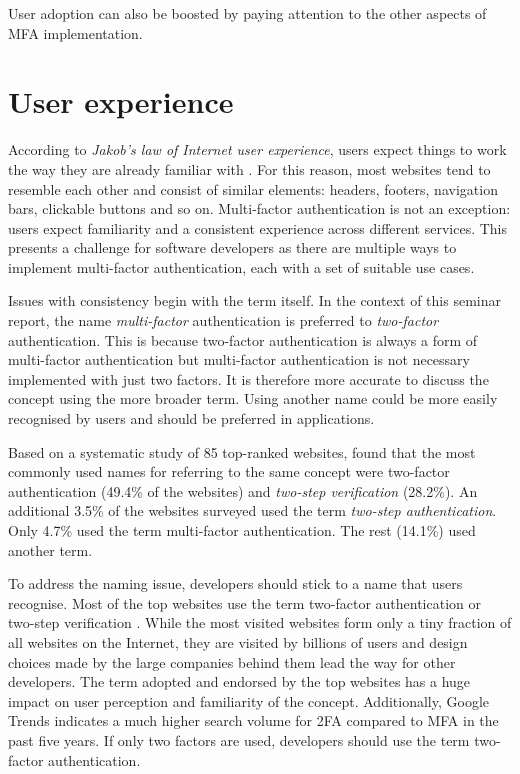 User adoption can also be boosted by paying attention to the other aspects of MFA implementation.


\section{User experience}

According to \textit{Jakob's law of Internet user experience}, users expect things to work the way they are already familiar with \citep{yablonski_laws_2020}. For this reason, most websites tend to resemble each other and consist of similar elements: headers, footers, navigation bars, clickable buttons and so on. Multi-factor authentication is not an exception: users expect familiarity and a consistent experience across different services. This presents a challenge for software developers as there are multiple ways to implement multi-factor authentication, each with a set of suitable use cases.

Issues with consistency begin with the term itself. In the context of this seminar report, the name \textit{multi-factor} authentication is preferred to \textit{two-factor} authentication. This is because two-factor authentication is always a form of multi-factor authentication but multi-factor authentication is not necessary implemented with just two factors. It is therefore more accurate to discuss the concept using the more broader term. Using another name could be more easily recognised by users and should be preferred in applications.

Based on a systematic study of 85 top-ranked websites, \textcite[10]{lyastani_systematic_2023} found that the most commonly used names for referring to the same concept were two-factor authentication (49.4\% of the websites) and \textit{two-step verification} (28.2\%). An additional 3.5\% of the websites surveyed used the term \textit{two-step authentication}. Only 4.7\% used the term multi-factor authentication. The rest (14.1\%) used another term.

To address the naming issue, developers should stick to a name that users recognise. Most of the top websites use the term two-factor authentication or two-step verification \citep[10]{lyastani_systematic_2023}. While the most visited websites form only a tiny fraction of all websites on the Internet, they are visited by billions of users and design choices made by the large companies behind them lead the way for other developers. The term adopted and endorsed by the top websites has a huge impact on user perception and familiarity of the concept. Additionally, Google Trends \citep{google_trends1_2024, google_trends2_2024} indicates a much higher search volume for 2FA compared to MFA in the past five years. If only two factors are used, developers should use the term two-factor authentication.


